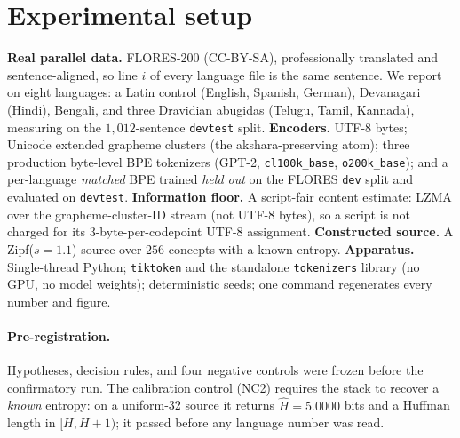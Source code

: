 \documentclass[11pt]{article}
\begin{document}
\section{Experimental setup}\label{sec:setup}
\textbf{Real parallel data.} FLORES-200 \citep{nllb2022flores} (CC-BY-SA), professionally translated and
sentence-aligned, so line $i$ of every language file is the same sentence. We report on eight languages:
a Latin control (English, Spanish, German), Devanagari (Hindi), Bengali, and three Dravidian abugidas
(Telugu, Tamil, Kannada), measuring on the $1{,}012$-sentence \texttt{devtest} split.
\textbf{Encoders.} UTF-8 bytes; Unicode extended grapheme clusters (the akshara-preserving atom); three
production byte-level BPE tokenizers (GPT-2, \texttt{cl100k\_base}, \texttt{o200k\_base}); and a
per-language \emph{matched} BPE trained \emph{held out} on the FLORES \texttt{dev} split and evaluated on
\texttt{devtest}. \textbf{Information floor.} A script-fair content estimate: LZMA over the
grapheme-cluster-ID stream (not UTF-8 bytes), so a script is not charged for its 3-byte-per-codepoint
UTF-8 assignment. \textbf{Constructed source.} A Zipf($s{=}1.1$) source over $256$ concepts with a known
entropy. \textbf{Apparatus.} Single-thread Python; \texttt{tiktoken} and the standalone
\texttt{tokenizers} library (no GPU, no model weights); deterministic seeds; one command regenerates
every number and figure.

\paragraph{Pre-registration.} Hypotheses, decision rules, and four negative controls were frozen before
the confirmatory run. The calibration control (NC2) requires the stack to recover a \emph{known}
entropy: on a uniform-32 source it returns $\hat H=5.0000$ bits and a Huffman length in $[H,H{+}1)$; it
passed before any language number was read.
\end{document}
